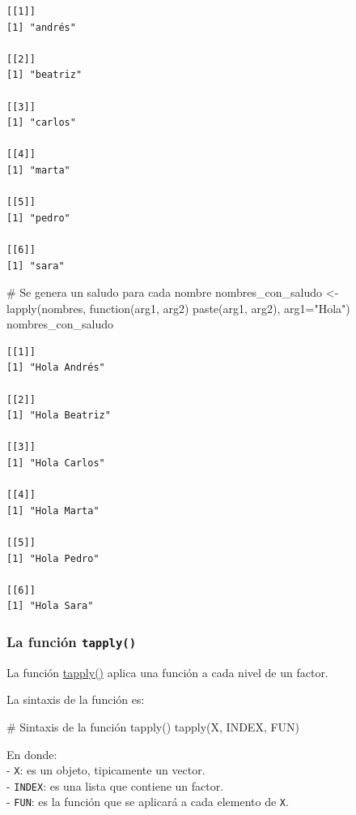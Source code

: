 \documentclass[
  letterpaper,
  DIV=11,
  numbers=noendperiod]{scrreprt}
\newenvironment{Shaded}{\begin{snugshade}}{\end{snugshade}}
\newcommand{\AttributeTok}[1]{\textcolor[rgb]{0.40,0.45,0.13}{#1}}
\newcommand{\CommentTok}[1]{\textcolor[rgb]{0.37,0.37,0.37}{#1}}
\newcommand{\ControlFlowTok}[1]{\textcolor[rgb]{0.00,0.23,0.31}{#1}}
\newcommand{\FunctionTok}[1]{\textcolor[rgb]{0.28,0.35,0.67}{#1}}
\newcommand{\NormalTok}[1]{\textcolor[rgb]{0.00,0.23,0.31}{#1}}
\newcommand{\OtherTok}[1]{\textcolor[rgb]{0.00,0.23,0.31}{#1}}
\newcommand{\StringTok}[1]{\textcolor[rgb]{0.13,0.47,0.30}{#1}}
\begin{document}
\begin{verbatim}
[[1]]
[1] "andrés"

[[2]]
[1] "beatriz"

[[3]]
[1] "carlos"

[[4]]
[1] "marta"

[[5]]
[1] "pedro"

[[6]]
[1] "sara"
\end{verbatim}

\begin{Shaded}
\begin{Highlighting}[]
\CommentTok{\# Se genera un saludo para cada nombre}
\NormalTok{nombres\_con\_saludo }\OtherTok{\textless{}{-}} \FunctionTok{lapply}\NormalTok{(nombres, }\ControlFlowTok{function}\NormalTok{(arg1, arg2) }\FunctionTok{paste}\NormalTok{(arg1, arg2), }\AttributeTok{arg1=}\StringTok{"Hola"}\NormalTok{)}
\NormalTok{nombres\_con\_saludo}
\end{Highlighting}
\end{Shaded}

\begin{verbatim}
[[1]]
[1] "Hola Andrés"

[[2]]
[1] "Hola Beatriz"

[[3]]
[1] "Hola Carlos"

[[4]]
[1] "Hola Marta"

[[5]]
[1] "Hola Pedro"

[[6]]
[1] "Hola Sara"
\end{verbatim}

\hypertarget{la-funciuxf3n-tapply}{%
\subsubsection{\texorpdfstring{La función
\texttt{tapply()}}{La función tapply()}}\label{la-funciuxf3n-tapply}}

La función \href{https://rdrr.io/r/base/tapply.html}{tapply()} aplica
una función a cada nivel de un factor.

La sintaxis de la función es:

\begin{Shaded}
\begin{Highlighting}[]
\CommentTok{\# Sintaxis de la función tapply()}
\FunctionTok{tapply}\NormalTok{(X, INDEX, FUN)}
\end{Highlighting}
\end{Shaded}

En donde:\\
- \texttt{X}: es un objeto, tipicamente un vector.\\
- \texttt{INDEX}: es una lista que contiene un factor.\\
- \texttt{FUN}: es la función que se aplicará a cada elemento de
\texttt{X}.
\end{document}
